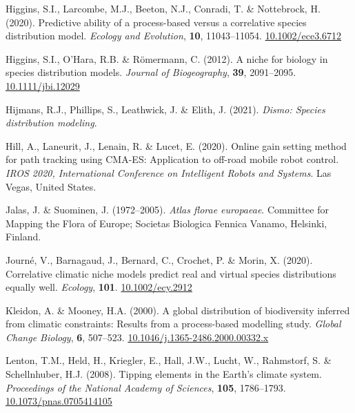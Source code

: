 \documentclass[11pt,]{article}
\newlength{\cslhangindent}
\newenvironment{CSLReferences}[2] %
 {%
  \setlength{\parindent}{0pt}
  \ifodd #1 \everypar{\setlength{\hangindent}{\cslhangindent}}\ignorespaces\fi
  \ifnum #2 > 0
  \setlength{\parskip}{#2\baselineskip}
  \fi
 }%
 {}
\begin{document}
\begin{CSLReferences}{1}{0}
\leavevmode{}%
Higgins, S.I., Larcombe, M.J., Beeton, N.J., Conradi, T. \& Nottebrock,
H. (2020). Predictive ability of a process-based versus a correlative
species distribution model. \emph{Ecology and Evolution}, \textbf{10},
11043--11054.
\href{https://doi.org/10.1002/ece3.6712}{10.1002/ece3.6712}

\leavevmode{}%
Higgins, S.I., O'Hara, R.B. \& Römermann, C. (2012). A niche for biology
in species distribution models. \emph{Journal of Biogeography},
\textbf{39}, 2091--2095.
\href{https://doi.org/10.1111/jbi.12029}{10.1111/jbi.12029}

\leavevmode{}%
Hijmans, R.J., Phillips, S., Leathwick, J. \& Elith, J. (2021).
\emph{Dismo: Species distribution modeling}.

\leavevmode{}%
Hill, A., Laneurit, J., Lenain, R. \& Lucet, E. (2020). {Online gain
setting method for path tracking using CMA-ES: Application to off-road
mobile robot control}. \emph{{IROS 2020, International Conference on
Intelligent Robots and Systems}}. Las Vegas, United States.

\leavevmode{}%
Jalas, J. \& Suominen, J. (1972--2005). \emph{Atlas florae europaeae}.
Committee for Mapping the Flora of Europe; Societas Biologica Fennica
Vanamo, Helsinki, Finland.

\leavevmode{}%
Journé, V., Barnagaud, J., Bernard, C., Crochet, P. \& Morin, X. (2020).
Correlative climatic niche models predict real and virtual species
distributions equally well. \emph{Ecology}, \textbf{101}.
\href{https://doi.org/10.1002/ecy.2912}{10.1002/ecy.2912}

\leavevmode{}%
Kleidon, A. \& Mooney, H.A. (2000). A global distribution of
biodiversity inferred from climatic constraints: Results from a
process-based modelling study. \emph{Global Change Biology}, \textbf{6},
507--523.
\href{https://doi.org/10.1046/j.1365-2486.2000.00332.x}{10.1046/j.1365-2486.2000.00332.x}

\leavevmode{}%
Lenton, T.M., Held, H., Kriegler, E., Hall, J.W., Lucht, W., Rahmstorf,
S. \& Schellnhuber, H.J. (2008). Tipping elements in the {Earth}'s
climate system. \emph{Proceedings of the National Academy of Sciences},
\textbf{105}, 1786--1793.
\href{https://doi.org/10.1073/pnas.0705414105}{10.1073/pnas.0705414105}


\end{CSLReferences}
\end{document}

